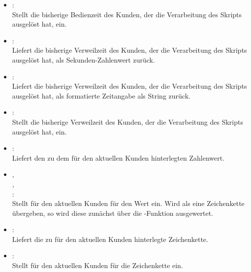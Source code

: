 \begin{itemize}
\item
{}:\\
Stellt die bisherige Bedienzeit des Kunden, der die Verarbeitung des Skripts ausgelöst hat, ein.

\item
{}:\\
Liefert die bisherige Verweilzeit des Kunden, der die Verarbeitung des Skripts ausgelöst hat, als Sekunden-Zahlenwert zurück.

\item
{}:\\
Liefert die bisherige Verweilzeit des Kunden, der die Verarbeitung des Skripts ausgelöst hat, als formatierte Zeitangabe als String zurück.

\item
{}:\\
Stellt die bisherige Verweilzeit des Kunden, der die Verarbeitung des Skripts ausgelöst hat, ein.

\item
{}:\\
Liefert den zu dem  für den aktuellen Kunden hinterlegten Zahlenwert.
  
\item
{},\\
,\\
:\\
Stellt für den aktuellen Kunden für  den Wert  ein.
Wird als  eine Zeichenkette übergeben, so wird diese zunächst über die
-Funktion ausgewertet.
  
\item
{}:\\
Liefert die zu  für den aktuellen Kunden hinterlegte Zeichenkette.
  
\item
{}:\\
Stellt für den aktuellen Kunden für  die Zeichenkette  ein.
	
\end{itemize}


